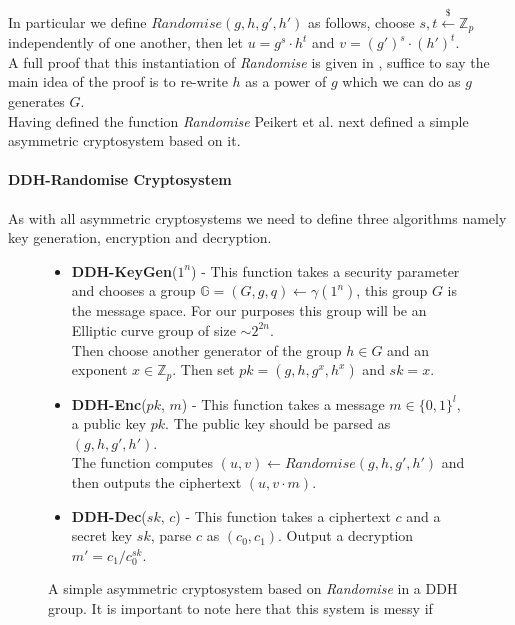 \documentclass[ %
                    author={Nicholas Tutte},
                supervisor={Prof. Nigel Smart},
                    degree={MEng},
                     title={Secure Two Party Computation},
                  subtitle={A practical comparison of recent protocols},
                      type={Research - GG1K},
                      year={2015} ]{dissertation}
\begin{document}
					In particular we define $Randomise(g, h, g', h')$ as follows, choose $s, t \xleftarrow{\$} \mathbb{Z}_p$ independently of one another, then let $u = g^s \cdot h^t$ and $v = (g')^s \cdot (h')^t$.\\
					A full proof that this instantiation of \emph{Randomise} is given in \cite{PVW_OT_2008}, suffice to say the main idea of the proof is to re-write $h$ as a power of $g$ which we can do as $g$ generates $G$.\\

					Having defined the function \emph{Randomise} Peikert et al. next defined a simple asymmetric cryptosystem based on it.

					\paragraph{DDH-Randomise Cryptosystem} As with all asymmetric cryptosystems we need to define three algorithms namely key generation, encryption and decryption.

					\begin{figure}[!htb]
						\begin{mdframed}
							\centering
							\begin{itemize}
								\item \textbf{DDH-KeyGen}($1^n$) - This function takes a security parameter and chooses a group $\mathbb{G} = (G, g, q) \leftarrow \gamma(1^n)$, this group $G$ is the message space. For our purposes this group will be an Elliptic curve group of size $\sim2^{2n}$.\\[0.25cm]

								Then choose another generator of the group $h \in G$ and an exponent $x \in \mathbb{Z}_p$. Then set $pk = (g, h, g^x, h^x)$ and $sk = x$. 

								\item \textbf{DDH-Enc}($pk$, $m$) - This function takes a message $m \in \{0, 1\}^l$, a public key $pk$. The public key should be parsed as $(g, h, g', h')$.\\[0.25cm]

								The function computes $(u, v) \leftarrow Randomise(g, h, g', h')$ and then outputs the ciphertext $(u, v \cdot m)$.

								\item \textbf{DDH-Dec}($sk$, $c$) - This function takes a ciphertext $c$ and a secret key $sk$, parse $c$ as $(c_0, c_1)$. Output a decryption $m' = c_1 / c_0^{sk}$.

							\end{itemize}
						\end{mdframed}

						\caption{A simple asymmetric cryptosystem based on \emph{Randomise} in a DDH group. It is important to note here that this system is messy if  \label{fig:DDH_Cryptosystem}}
					\end{figure}
\end{document}
